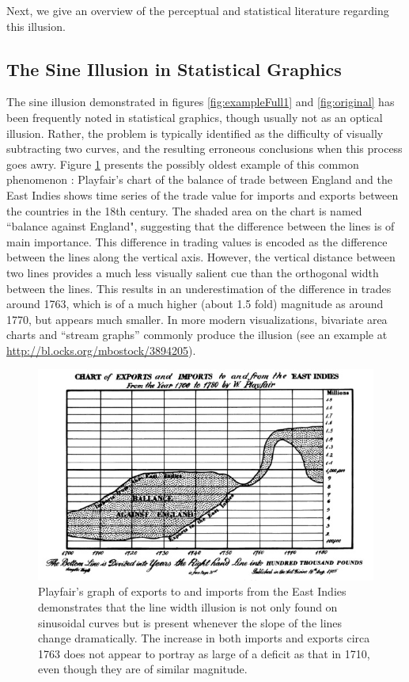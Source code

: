 \documentclass[11pt]{isuthesis}\usepackage[]{graphicx}\usepackage[]{color}
\begin{document}
Next, we give an overview of the perceptual and statistical literature regarding this illusion.
\subsection{The Sine Illusion in Statistical Graphics}\label{statisticalgraphics}\hfill\newline
The sine illusion demonstrated in figures \ref{fig:exampleFull1} and \ref{fig:original} has been frequently noted in statistical graphics, though usually not as an optical illusion. Rather, the problem is typically identified as the difficulty of visually subtracting two curves, and the resulting erroneous conclusions when this process goes awry. Figure \ref{fig:playfair-debt} presents the possibly oldest example of this common phenomenon \citep{playfair, playfair2}: Playfair's chart of the balance of trade between England and the East Indies shows time series of the trade value for imports  and exports between the countries in the 18th century. The shaded area on the chart is named ``balance against England", suggesting that the difference between the lines is of main importance. This difference in trading values is encoded as the difference between the lines along the vertical axis. However, the vertical distance  between  two lines provides a  much less visually salient cue than the orthogonal width between the lines. This results in  an underestimation \citep{cleveland:1984} of the difference in trades around 1763, which is of a much higher (about 1.5 fold) magnitude as around 1770, but appears much smaller. In more modern visualizations, bivariate area charts and ``stream graphs'' \citep{stackedgraphs} commonly produce the illusion (see an example at \url{http://bl.ocks.org/mbostock/3894205}). 

\begin{figure}[h!tbp]
\centering
\includegraphics[keepaspectratio=TRUE,width=.7\textwidth]{PlayfairExportImports}
\caption[Imports to and Exports from the East Indies in the 1700s]{Playfair's graph of exports to and imports from the East Indies demonstrates that the line width illusion is not only found on sinusoidal curves but is present whenever the slope of the lines change dramatically. The increase in both imports and exports circa 1763 does not appear to portray as large of a deficit as that in 1710, even though they are of similar magnitude.}
\label{fig:playfair-debt}
\end{figure}
\end{document}
